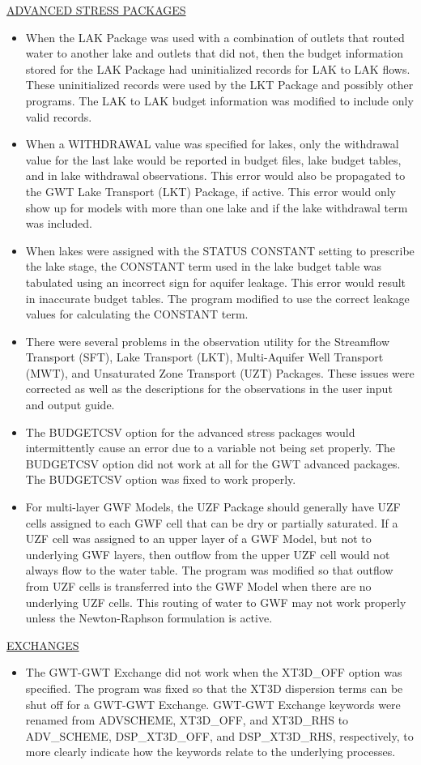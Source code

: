 	\underline{ADVANCED STRESS PACKAGES}
	\begin{itemize}
		\item When the LAK Package was used with a combination of outlets that routed water to another lake and outlets that did not, then the budget information stored for the LAK Package had uninitialized records for LAK to LAK flows.  These uninitialized records were used by the LKT Package and possibly other programs.  The LAK to LAK budget information was modified to include only valid records.
		\item When a WITHDRAWAL value was specified for lakes, only the withdrawal value for the last lake would be reported in budget files, lake budget tables, and in lake withdrawal observations.  This error would also be propagated to the GWT Lake Transport (LKT) Package, if active.  This error would only show up for models with more than one lake and if the lake withdrawal term was included.
		\item When lakes were assigned with the STATUS CONSTANT setting to prescribe the lake stage, the CONSTANT term used in the lake budget table was tabulated using an incorrect sign for aquifer leakage.  This error would result in inaccurate budget tables.  The program modified to use the correct leakage values for calculating the CONSTANT term.
		\item There were several problems in the observation utility for the Streamflow Transport (SFT), Lake Transport (LKT), Multi-Aquifer Well Transport (MWT), and Unsaturated Zone Transport (UZT) Packages.  These issues were corrected as well as the descriptions for the observations in the user input and output guide.
		\item The BUDGETCSV option for the advanced stress packages would intermittently cause an error due to a variable not being set properly.  The BUDGETCSV option did not work at all for the GWT advanced packages.  The BUDGETCSV option was fixed to work properly.
		\item For multi-layer GWF Models, the UZF Package should generally have UZF cells assigned to each GWF cell that can be dry or partially saturated.  If a UZF cell was assigned to an upper layer of a GWF Model, but not to underlying GWF layers, then outflow from the upper UZF cell would not always flow to the water table.  The program was modified so that outflow from UZF cells is transferred into the GWF Model when there are no underlying UZF cells.  This routing of water to GWF may not work properly unless the Newton-Raphson formulation is active.
	\end{itemize}

	\underline{EXCHANGES}
	\begin{itemize}
		\item The GWT-GWT Exchange did not work when the XT3D\_OFF option was specified.  The program was fixed so that the XT3D dispersion terms can be shut off for a GWT-GWT Exchange.  GWT-GWT Exchange keywords were renamed from ADVSCHEME, XT3D\_OFF, and XT3D\_RHS to ADV\_SCHEME, DSP\_XT3D\_OFF, and DSP\_XT3D\_RHS, respectively, to more clearly indicate how the keywords relate to the underlying processes.  
	\end{itemize}
	
	
